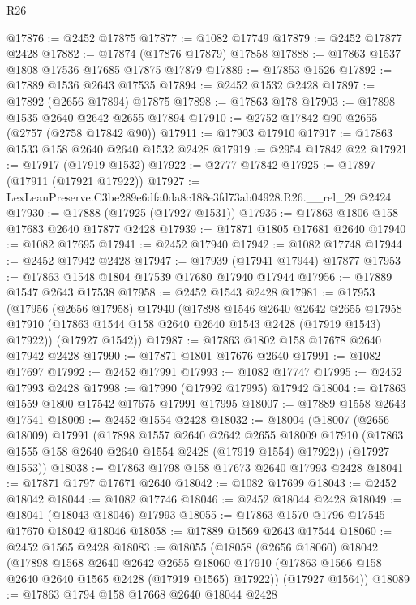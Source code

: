\begin{lexlean}{R26}
\begin{coremodule}
@17876 := @2452 @17875
@17877 := @1082 @17749
@17879 := @2452 @17877 @2428
@17882 := @17874 (@17876 @17879) @17858
@17888 := @17863 @1537 @1808 @17536 @17685 @17875 @17879
@17889 := @17853 @1526
@17892 := @17889 @1536 @2643 @17535
@17894 := @2452 @1532 @2428
@17897 := @17892 (@2656 @17894) @17875
@17898 := @17863 @178
@17903 := @17898 @1535 @2640 @2642 @2655 @17894
@17910 := @2752 @17842 @90 @2655 (@2757 (@2758 @17842 @90))
@17911 := @17903 @17910
@17917 := @17863 @1533 @158 @2640 @2640 @1532 @2428
@17919 := @2954 @17842 @22
@17921 := @17917 (@17919 @1532)
@17922 := @2777 @17842
@17925 := @17897 (@17911 (@17921 @17922))
@17927 := LexLeanPreserve.C3be289e6dfa0da8c188e3fd73ab04928.R26.__rel_29 @2424
@17930 := @17888 (@17925 (@17927 @1531))
@17936 := @17863 @1806 @158 @17683 @2640 @17877 @2428
@17939 := @17871 @1805 @17681 @2640
@17940 := @1082 @17695
@17941 := @2452 @17940
@17942 := @1082 @17748
@17944 := @2452 @17942 @2428
@17947 := @17939 (@17941 @17944) @17877
@17953 := @17863 @1548 @1804 @17539 @17680 @17940 @17944
@17956 := @17889 @1547 @2643 @17538
@17958 := @2452 @1543 @2428
@17981 := @17953
    (@17956
      (@2656 @17958)
      @17940
      (@17898
        @1546
        @2640
        @2642
        @2655
        @17958
        @17910
        (@17863 @1544 @158 @2640 @2640 @1543 @2428 (@17919 @1543) @17922))
      (@17927 @1542))
@17987 := @17863 @1802 @158 @17678 @2640 @17942 @2428
@17990 := @17871 @1801 @17676 @2640
@17991 := @1082 @17697
@17992 := @2452 @17991
@17993 := @1082 @17747
@17995 := @2452 @17993 @2428
@17998 := @17990 (@17992 @17995) @17942
@18004 := @17863 @1559 @1800 @17542 @17675 @17991 @17995
@18007 := @17889 @1558 @2643 @17541
@18009 := @2452 @1554 @2428
@18032 := @18004
    (@18007
      (@2656 @18009)
      @17991
      (@17898
        @1557
        @2640
        @2642
        @2655
        @18009
        @17910
        (@17863 @1555 @158 @2640 @2640 @1554 @2428 (@17919 @1554) @17922))
      (@17927 @1553))
@18038 := @17863 @1798 @158 @17673 @2640 @17993 @2428
@18041 := @17871 @1797 @17671 @2640
@18042 := @1082 @17699
@18043 := @2452 @18042
@18044 := @1082 @17746
@18046 := @2452 @18044 @2428
@18049 := @18041 (@18043 @18046) @17993
@18055 := @17863 @1570 @1796 @17545 @17670 @18042 @18046
@18058 := @17889 @1569 @2643 @17544
@18060 := @2452 @1565 @2428
@18083 := @18055
    (@18058
      (@2656 @18060)
      @18042
      (@17898
        @1568
        @2640
        @2642
        @2655
        @18060
        @17910
        (@17863 @1566 @158 @2640 @2640 @1565 @2428 (@17919 @1565) @17922))
      (@17927 @1564))
@18089 := @17863 @1794 @158 @17668 @2640 @18044 @2428

\end{coremodule}
\end{lexlean}
